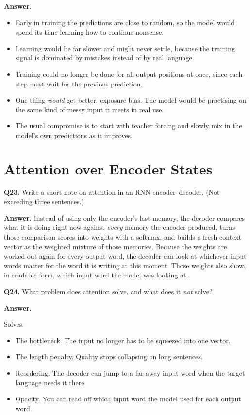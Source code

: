 \documentclass[11pt]{article}
\begin{document}
\textbf{Answer.}
\begin{itemize}
  \item Early in training the predictions are close to random, so the model would spend its time learning how to continue nonsense.
  \item Learning would be far slower and might never settle, because the training signal is dominated by mistakes instead of by real language.
  \item Training could no longer be done for all output positions at once, since each step must wait for the previous prediction.
  \item One thing \emph{would} get better: exposure bias. The model would be practising on the same kind of messy input it meets in real use.
  \item The usual compromise is to start with teacher forcing and slowly mix in the model's own predictions as it improves.
\end{itemize}

\section{Attention over Encoder States}

\textbf{Q23.} Write a short note on attention in an RNN encoder--decoder. (Not exceeding three
sentences.)

\textbf{Answer.} Instead of using only the encoder's last memory, the decoder compares what it
is doing right now against \emph{every} memory the encoder produced, turns those comparison
scores into weights with a softmax, and builds a fresh context vector as the weighted mixture
of those memories. Because the weights are worked out again for every output word, the decoder
can look at whichever input words matter for the word it is writing at this moment. Those
weights also show, in readable form, which input word the model was looking at.

\medskip
\textbf{Q24.} What problem does attention solve, and what does it \emph{not} solve?

\textbf{Answer.}

Solves:
\begin{itemize}
  \item The bottleneck. The input no longer has to be squeezed into one vector.
  \item The length penalty. Quality stops collapsing on long sentences.
  \item Reordering. The decoder can jump to a far-away input word when the target language needs it there.
  \item Opacity. You can read off which input word the model used for each output word.
\end{itemize}
\end{document}
